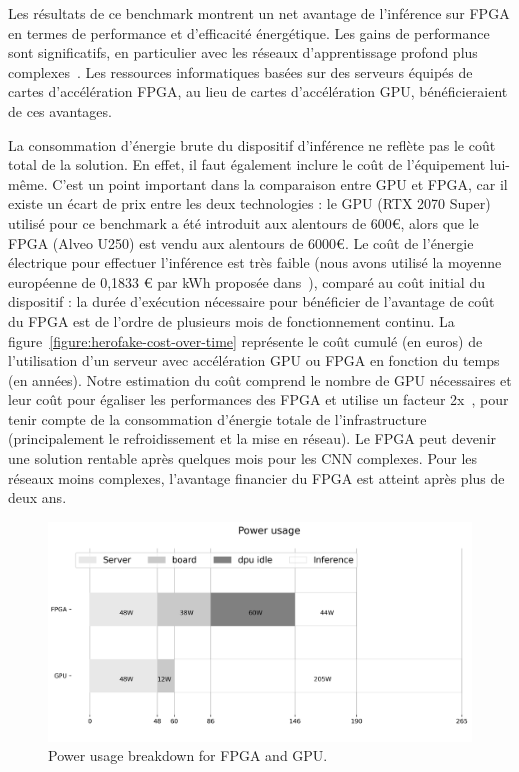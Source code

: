 Les résultats de ce benchmark montrent un net avantage de l'inférence sur FPGA en termes de performance et d'efficacité énergétique. Les gains de performance sont significatifs, en particulier avec les réseaux d'apprentissage profond plus complexes~\cite{8782524}. Les ressources informatiques basées sur des serveurs équipés de cartes d'accélération FPGA, au lieu de cartes d'accélération GPU, bénéficieraient de ces avantages.

La consommation d'énergie brute du dispositif d'inférence ne reflète pas le coût total de la solution. En effet, il faut également inclure le coût de l'équipement lui-même. C'est un point important dans la comparaison entre GPU et FPGA, car il existe un écart de prix entre les deux technologies : le GPU (RTX 2070 Super) utilisé pour ce benchmark a été introduit aux alentours de 600€, alors que le FPGA (Alveo U250) est vendu aux alentours de 6000€. Le coût de l'énergie électrique pour effectuer l'inférence est très faible (nous avons utilisé la moyenne européenne de 0,1833 € par kWh proposée dans~\cite{energy-price}), comparé au coût initial du dispositif : la durée d'exécution nécessaire pour bénéficier de l'avantage de coût du FPGA est de l'ordre de plusieurs mois de fonctionnement continu. La figure~\ref{figure:herofake-cost-over-time} représente le coût cumulé (en euros) de l'utilisation d'un serveur avec accélération GPU ou FPGA en fonction du temps (en années). Notre estimation du coût comprend le nombre de GPU nécessaires et leur coût pour égaliser les performances des FPGA et utilise un facteur 2x~\cite{shehabiUnitedStatesData2016}, pour tenir compte de la consommation d'énergie totale de l'infrastructure (principalement le refroidissement et la mise en réseau). Le FPGA peut devenir une solution rentable après quelques mois pour les CNN complexes. Pour les réseaux moins complexes, l'avantage financier du FPGA est atteint après plus de deux ans.

\begin{figure}[t]
\centering
\includegraphics[width=\columnwidth]{5_Chapitre3/figures/characterization/power_usage.png}
\caption{Power usage breakdown for FPGA and GPU.}
\label{figure:herofake-power-usage}
\end{figure}


